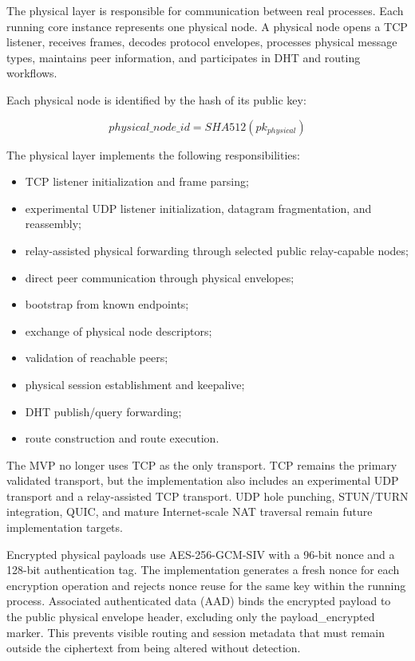 \documentclass[12pt]{article}
\newcommand{\codebreak}[1]{{\footnotesize\ttfamily #1}}
\begin{document}
The physical layer is responsible for communication between real processes. Each running core instance represents one physical node. A physical node opens a TCP listener, receives frames, decodes protocol envelopes, processes physical message types, maintains peer information, and participates in DHT and routing workflows.

Each physical node is identified by the hash of its public key:

\begin{equation}
    physical\_node\_id = SHA512(pk_{physical})
\end{equation}

The physical layer implements the following responsibilities:

\begin{itemize}
    \item TCP listener initialization and frame parsing;
    \item experimental UDP listener initialization, datagram fragmentation, and reassembly;
    \item relay-assisted physical forwarding through selected public relay-capable nodes;
    \item direct peer communication through physical envelopes;
    \item bootstrap from known endpoints;
    \item exchange of physical node descriptors;
    \item validation of reachable peers;
    \item physical session establishment and keepalive;
    \item DHT publish/query forwarding;
    \item route construction and route execution.
\end{itemize}

The MVP no longer uses TCP as the only transport. TCP remains the primary validated transport, but the implementation also includes an experimental UDP transport and a relay-assisted TCP transport. UDP hole punching, STUN/TURN integration, QUIC, and mature Internet-scale NAT traversal remain future implementation targets.

Encrypted physical payloads use AES-256-GCM-SIV with a 96-bit nonce and a 128-bit authentication tag. The implementation generates a fresh nonce for each encryption operation and rejects nonce reuse for the same key within the running process. Associated authenticated data (AAD) binds the encrypted payload to the public physical envelope header, excluding only the \codebreak{payload\_\allowbreak{}encrypted} marker. This prevents visible routing and session metadata that must remain outside the ciphertext from being altered without detection.
\end{document}
